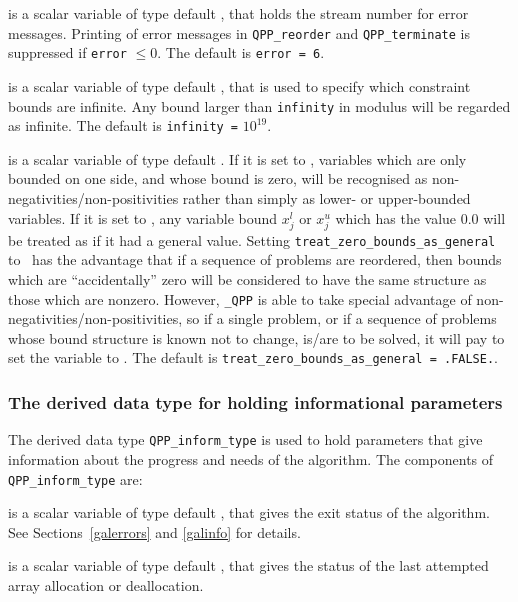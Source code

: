 \documentclass{galahad}
\newcommand{\packagename}{QPP}
\newcommand{\fullpackagename}{\libraryname\_\packagename}
\begin{document}
\begin{description}

 is a scalar variable of type default \integer, that holds the
stream number for error messages. Printing of error messages in
{\tt \packagename\_reorder} and {\tt \packagename\_terminate}
is suppressed if {\tt error} $\leq 0$.
The default is {\tt error = 6}.

 is a scalar variable of type default \realdp, that is used to
specify which constraint bounds are infinite.
Any bound larger than {\tt infinity} in modulus will be regarded as infinite.
The default is {\tt infinity =} $10^{19}$.

 is a scalar variable of type
default \logical.
If it is set to \false, variables which
are only bounded on one side, and whose bound is zero,
will be recognised as non-negativities/non-positivities rather than simply as
lower- or upper-bounded variables.
If it is set to \true, any variable bound
$x_{j}^{l}$ or $x_{j}^{u}$ which has the value 0.0 will be
treated as if it had a general value.
Setting {\tt treat\_zero\_bounds\_as\_general} to \true\ has the advantage
that if a sequence of problems are reordered, then bounds which are
``accidentally'' zero will be considered to have the same structure as
those which are nonzero. However, {\tt \fullpackagename} is
able to take special advantage of non-negativities/non-positivities, so
if a single problem, or if a sequence of problems whose
bound structure is known not to change, is/are to be solved,
it will pay to set the variable to \false.
The default is {\tt treat\_zero\_bounds\_as\_general = .FALSE.}.

\end{description}


\subsubsection{The derived data type for holding informational
 parameters}\label{typeinform}
The derived data type
{\tt \packagename\_inform\_type}
is used to hold parameters that give information about the progress and needs
of the algorithm. The components of
{\tt \packagename\_inform\_type}
are:

\begin{description}

 is a scalar variable of type default \integer, that gives the
exit status of the algorithm. See Sections~\ref{galerrors} and \ref{galinfo}
for details.

 is a scalar variable of type default \integer, that gives
the status of the last attempted array allocation or deallocation.

\end{description}
\end{document}
